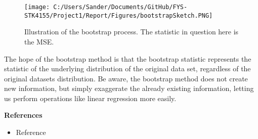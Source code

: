 \documentclass[12pt,a4paper]{article}
\begin{document}
\begin{figure}[H]
\centering
\texttt{[image: C:/Users/Sander/Documents/GitHub/FYS-STK4155/Project1/Report/Figures/bootstrapSketch.PNG]}
\caption{\label{fig:Bootsketch} Illustration of the bootstrap process. The statistic in question here is the MSE.}
\end{figure}

\noindent The hope of the bootstrap method is that the bootstrap statistic represents the statistic of the underlying distribution of the original data set, regardless of the original datasets distribution. Be aware, the bootstrap method does not create new information, but simply exaggerate the already existing information, letting us perform operations like linear regression more easily.

\newpage

\begin{center}
\Large{\textbf{References}}
\end{center}

\begin{itemize}
  \item Reference
\end{itemize}
\end{document}
